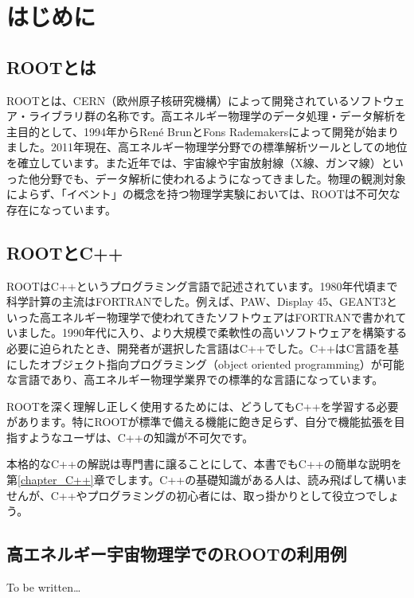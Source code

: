 \chapter{はじめに}

\section{ROOTとは}
ROOTとは、CERN（欧州原子核研究機構）によって開発されているソフトウェア・ライブラリ群の名称です。高エネルギー物理学のデータ処理・データ解析を主目的として、1994年からRen\'e BrunとFons Rademakersによって開発が始まりました。2011年現在、高エネルギー物理学分野での標準解析ツールとしての地位を確立しています。また近年では、宇宙線や宇宙放射線（X線、ガンマ線）といった他分野でも、データ解析に使われるようになってきました。物理の観測対象によらず、「イベント」の概念を持つ物理学実験においては、ROOTは不可欠な存在になっています。

\section{ROOTとC++}
ROOTはC++というプログラミング言語で記述されています。1980年代頃まで科学計算の主流はFORTRANでした。例えば、PAW、Display 45、GEANT3といった高エネルギー物理学で使われてきたソフトウェアはFORTRANで書かれていました。1990年代に入り、より大規模で柔軟性の高いソフトウェアを構築する必要に迫られたとき、開発者が選択した言語はC++でした。C++はC言語を基にしたオブジェクト指向プログラミング（object oriented programming）が可能な言語であり、高エネルギー物理学業界での標準的な言語になっています。

ROOTを深く理解し正しく使用するためには、どうしてもC++を学習する必要があります。特にROOTが標準で備える機能に飽き足らず、自分で機能拡張を目指すようなユーザは、C++の知識が不可欠です。

本格的なC++の解説は専門書に譲ることにして、本書でもC++の簡単な説明を第\ref{chapter_C++}章でします。C++の基礎知識がある人は、読み飛ばして構いませんが、C++やプログラミングの初心者には、取っ掛かりとして役立つでしょう。

\section{高エネルギー宇宙物理学でのROOTの利用例}
To be written\ldots

